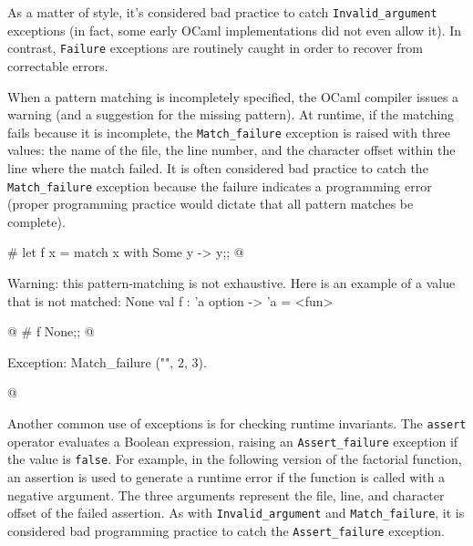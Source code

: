 As a matter of style, it's considered bad practice to catch \hbox{\lstinline/Invalid_argument/}
exceptions (in fact, some early OCaml implementations did not even allow it).  In
contrast, \hbox{\lstinline/Failure/} exceptions are routinely caught in order to recover from
correctable errors.


When a pattern matching is incompletely specified, the OCaml compiler issues a warning (and a
suggestion for the missing pattern).  At runtime, if the matching fails because it is incomplete,
the \hbox{\lstinline/Match_failure/} exception is raised with three values: the name of the file, the line
number, and the character offset within the line where the match failed.  It is often considered bad
practice to catch the \hbox{\lstinline/Match_failure/} exception because the failure indicates a
programming error (proper programming practice would dictate that all pattern matches be complete).

\begin{ocaml}
# let f x =
     match x with
        Some y -> y;;
@
\begin{toperror}
Warning: this pattern-matching is not exhaustive.
Here is an example of a value that is not matched:
None
val f : 'a option -> 'a = <fun>
\end{toperror}
@
# f None;;
@
\begin{toperror}
Exception: Match_failure ("", 2, 3).
\end{toperror}
@
\end{ocaml}

\label{keyword:assert}

Another common use of exceptions is for checking runtime invariants.  The \hbox{\lstinline/assert/} operator
evaluates a Boolean expression, raising an \hbox{\lstinline/Assert_failure/} exception if the value is
\hbox{\lstinline/false/}.  For example, in the following version of the factorial function, an assertion is used
to generate a runtime error if the function is called with a negative argument.  The three arguments
represent the file, line, and character offset of the failed assertion.  As
with \hbox{\lstinline/Invalid_argument/} and \hbox{\lstinline/Match_failure/}, it is considered bad programming
practice to catch the \verb/Assert_failure/ exception.

